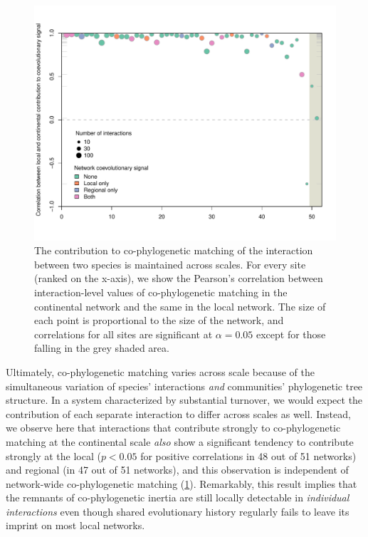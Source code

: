\documentclass[11pt,serif]{article}
\begin{document}
\begin{figure}[htbp]
\centering
\includegraphics[width=1.00000\textwidth]{figure/scales-1.pdf}
\caption{The contribution to co-phylogenetic matching of the interaction
between two species is maintained across scales. For every site (ranked
on the x-axis), we show the Pearson's correlation between
interaction-level values of co-phylogenetic matching in the continental
network and the same in the local network. The size of each point is
proportional to the size of the network, and correlations for all sites
are significant at \(\alpha = 0.05\) except for those falling in the
grey shaded area.\label{fig:scales}}
\end{figure}

Ultimately, co-phylogenetic matching varies across scale because of the
simultaneous variation of species' interactions \emph{and} communities'
phylogenetic tree structure. In a system characterized by substantial
turnover, we would expect the contribution of each separate interaction
to differ across scales as well. Instead, we observe here that
interactions that contribute strongly to co-phylogenetic matching at the
continental scale \emph{also} show a significant tendency to contribute
strongly at the local (\(p < 0.05\) for positive correlations in 48 out
of 51 networks) and regional (in 47 out of 51 networks), and this
observation is independent of network-wide co-phylogenetic matching
(\cref{fig:scales}). Remarkably, this result implies that
the remnants of co-phylogenetic inertia are still locally detectable in
\emph{individual interactions} even though shared evolutionary history
regularly fails to leave its imprint on most local networks.
\end{document}
